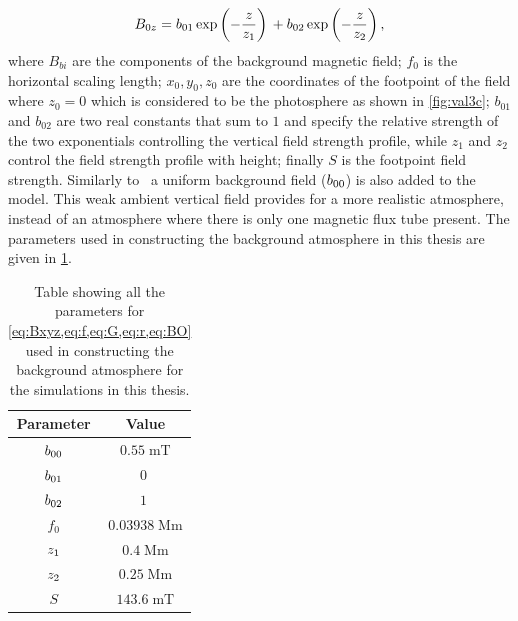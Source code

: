 \documentclass[a4paper,12pt,fourier,authoryear,custommargin]{Classes/PhDThesisPSnPDF}
\begin{document}
\begin{equation}\label{eq:BO}
{B_{0z}} =
{b_{01}}\exp\left(-\frac{z}{{z_{1}}}\right)\,
+
{b_{02}}\exp\left(-\frac{z}{{z_{2}}}\right),
\end{equation}
where $B_{bi}$ are the components of the background magnetic field; $f_0$ is the horizontal scaling length; $x_0,y_0,z_0$ are the coordinates of the footpoint of the field where $z_0=0$ which is considered to be the photosphere as shown in \cref{fig:val3c}; $b_{01}$ and $b_{02}$ are two real constants that sum to $1$ and specify the relative strength of the two exponentials controlling the vertical field strength profile, while $z_1$ and $z_2$ control the field strength profile with height; finally $S$ is the footpoint field strength.
Similarly to~\cite{gent2014} a uniform background field (${b_{00}}$) is also added to the model.
This weak ambient vertical field provides for a more realistic atmosphere, instead of an atmosphere where there is only one magnetic flux tube present.
The parameters used in constructing the background atmosphere in this thesis are given in \cref{tab:bgparams}.

\begin{table}
    \centering
    \begin{tabular}{|c|c|}
        \hline Parameter & Value \\
        \hline ${b_{00}}$ & $0.55 \; \mathrm{mT}$
\\
        \hline ${b_{01}}$ & $0 \; \mathrm{}$
\\
        \hline ${b_{02}}$ & $1 \; \mathrm{}$
\\
        \hline $f_0$ & $0.03938 \; \mathrm{Mm}$
\\
        \hline ${z_{1}}$ & $0.4 \; \mathrm{Mm}$
\\
        \hline ${z_{2}}$ & $0.25 \; \mathrm{Mm}$
\\
        \hline $S$   & $143.6 \; \mathrm{mT}$
\\
        \hline
    \end{tabular}

    \caption{Table showing all the parameters for \cref{eq:Bxyz,eq:f,eq:G,eq:r,eq:BO} used in constructing the background atmosphere for the simulations in this thesis.}
    \label{tab:bgparams}
\end{table}
\end{document}
